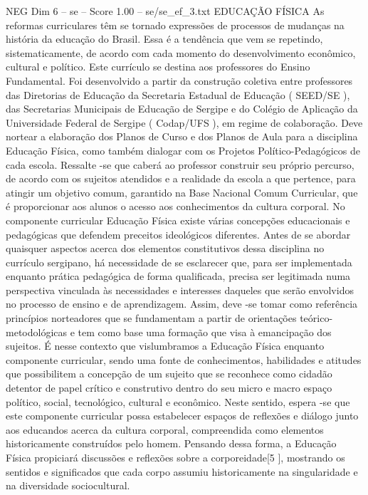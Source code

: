 \begin{textsample}{NEG Dim 6 – se – Score 1.00 – se/se\_ef\_3.txt}  \label{ex:f6_neg_249}
EDUCAÇÃO FÍSICA As reformas curriculares têm se tornado expressões de processos de mudanças na história da educação do Brasil.
Essa é a tendência que vem se repetindo, sistematicamente, de acordo com cada momento do desenvolvimento econômico, cultural e político.
Este currículo se destina aos professores do Ensino Fundamental.
Foi desenvolvido a partir da construção coletiva entre professores das Diretorias de Educação da Secretaria Estadual de Educação ( SEED/SE ), das Secretarias Municipais de Educação de Sergipe e do Colégio de Aplicação da Universidade Federal de Sergipe ( Codap/UFS ), em regime de colaboração.
Deve nortear a elaboração dos Planos de Curso e dos Planos de Aula para a disciplina Educação Física, como também dialogar com os Projetos Político-Pedagógicos de cada escola.
Ressalte -se que caberá ao professor construir seu próprio percurso, de acordo com os sujeitos atendidos e a realidade da escola a que pertence, para atingir um objetivo comum, garantido na Base Nacional Comum Curricular, que é proporcionar aos alunos o acesso aos conhecimentos da cultura corporal.
No componente curricular Educação Física existe várias concepções educacionais e pedagógicas que defendem preceitos ideológicos diferentes.
Antes de se abordar quaisquer aspectos acerca dos elementos constitutivos dessa disciplina no currículo sergipano, há necessidade de se esclarecer que, para ser implementada enquanto prática pedagógica de forma qualificada, precisa ser legitimada numa perspectiva vinculada às necessidades e interesses daqueles que serão envolvidos no processo de ensino e de aprendizagem.
Assim, deve -se tomar como referência princípios norteadores que se fundamentam a partir de orientações teórico-metodológicas e tem como base uma formação que visa à emancipação dos sujeitos.
É nesse contexto que vislumbramos a Educação Física enquanto componente curricular, sendo uma fonte de conhecimentos, habilidades e atitudes que possibilitem a concepção de um sujeito que se reconhece como cidadão detentor de papel crítico e construtivo dentro do seu micro e macro espaço político, social, tecnológico, cultural e econômico.
Neste sentido, espera -se que este componente curricular possa estabelecer espaços de reflexões e diálogo junto aos educandos acerca da cultura corporal, compreendida como elementos historicamente construídos pelo homem.
Pensando dessa forma, a Educação Física propiciará discussões e reflexões sobre a corporeidade[5 ], mostrando os sentidos e significados que cada corpo assumiu historicamente na singularidade e na diversidade sociocultural.

\end{textsample}
